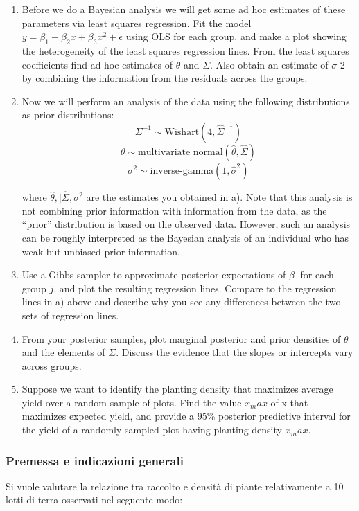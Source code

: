 \begin{enumerate}
    \item Before we do a Bayesian analysis we will get some ad hoc estimates of these parameters via
    least squares regression. Fit the model $y = \beta_1 +\beta_2 x+\beta_3 x^2 + \epsilon$ using OLS for each group,
    and make a plot showing the heterogeneity of the least squares regression lines. 
    From the least squares coefficients find ad hoc estimates of $\theta$  and $\Sigma$. 
    Also obtain an estimate of $\sigma$ 2 by combining the information from the residuals across the groups.
    \item Now we will perform an analysis of the data using the following distributions as prior distributions:
    $$ \Sigma^{-1} \sim \text{Wishart}(4, \hat\Sigma^{-1})$$
    $$ \theta \sim \text{multivariate normal} (\hat\theta, \hat\Sigma)$$
    $$ \sigma^2 \sim \text{inverse-gamma}(1, \hat\sigma^2)$$

    where $\hat\theta,|\hat\Sigma, \sigma^2 $ are the estimates you obtained in a). 
    Note that this analysis is not combining prior information with information from the data, as the “prior” distribution is based on
    the observed data. 
    However, such an analysis can be roughly interpreted as the Bayesian
    analysis of an individual who has weak but unbiased prior information.
    
    \item Use a Gibbs sampler to approximate posterior expectations of $\beta$ for each group $j$, and plot
    the resulting regression lines. Compare to the regression lines in a) above and describe why
    you see any differences between the two sets of regression lines.

    \item From your posterior samples, plot marginal posterior and prior densities of $\theta$ and the
    elements of $\Sigma$. 
    Discuss the evidence that the slopes or intercepts vary across groups.
    \item Suppose we want to identify the planting density that maximizes average yield over a
    random sample of plots. 
    Find the value $x_max$ of x that maximizes expected yield, and
    provide a 95\% posterior predictive interval for the yield of a randomly sampled plot having
    planting density $x_max$.
\end{enumerate}

\subsubsection*{Premessa e indicazioni generali}
Si vuole valutare la relazione tra raccolto e densità di piante
relativamente a 10 lotti di terra osservati nel seguente modo:


